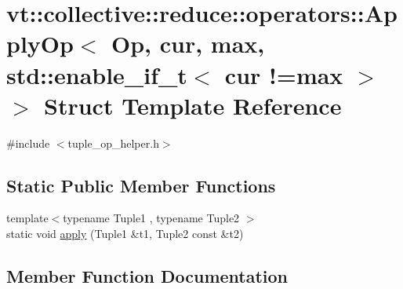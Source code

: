 \hypertarget{structvt_1_1collective_1_1reduce_1_1operators_1_1_apply_op_3_01_op_00_01cur_00_01max_00_01std_1_937201b57e5f1198bb3aecf49733237f}{}\section{vt\+:\+:collective\+:\+:reduce\+:\+:operators\+:\+:Apply\+Op$<$ Op, cur, max, std\+:\+:enable\+\_\+if\+\_\+t$<$ cur !=max $>$ $>$ Struct Template Reference}
\label{structvt_1_1collective_1_1reduce_1_1operators_1_1_apply_op_3_01_op_00_01cur_00_01max_00_01std_1_937201b57e5f1198bb3aecf49733237f}


{\ttfamily \#include $<$tuple\+\_\+op\+\_\+helper.\+h$>$}

\subsection*{Static Public Member Functions}
\begin{DoxyCompactItemize}
\item 
{\footnotesize template$<$typename Tuple1 , typename Tuple2 $>$ }\\static void \hyperlink{structvt_1_1collective_1_1reduce_1_1operators_1_1_apply_op_3_01_op_00_01cur_00_01max_00_01std_1_937201b57e5f1198bb3aecf49733237f_a213ef43a07c3169711c3ca94dcac7733}{apply} (Tuple1 \&t1, Tuple2 const \&t2)
\end{DoxyCompactItemize}


\subsection{Member Function Documentation}
\mbox{\label{structvt_1_1collective_1_1reduce_1_1operators_1_1_apply_op_3_01_op_00_01cur_00_01max_00_01std_1_937201b57e5f1198bb3aecf49733237f_a213ef43a07c3169711c3ca94dcac7733}} 
